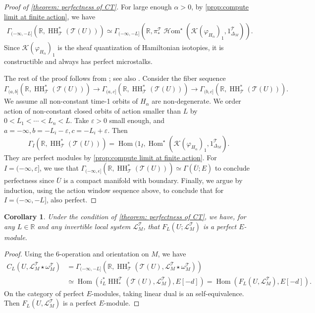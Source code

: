 \documentclass[11pt]{amsart}
\numberwithin{equation}{section}
\theoremstyle{plain}
\newtheorem{Coro}[coro]{Corollary}
\theoremstyle{definition}
\theoremstyle{remark}
\newcommand{\bR} { {\mathbb{R}}}
\newcommand{\cK} { {\mathcal{K}}}
\newcommand{\sT} { {\mathscr{T}}}
\newcommand\HH{\operatorname{HH}}
\newcommand\Hom{\operatorname{Hom}}
\newcommand\sHom{\operatorname{\mathscr{H}om}}
\begin{document}
\begin{proof}[Proof of \autoref{theorem: perfectness of CT}]
For large enough $\alpha > 0$, by \autoref{prop:compute limit at finite action}, we have
\begin{align*}
\Gamma_{(-\infty,-L]}(\bR, \HH_\sT^*(\sT(U))) 
\simeq \Gamma_{(-\infty, -L]}(\bR, \pi_*^\sT\sHom^\star(\cK(\varphi_{H_\alpha})_1, 1_{\Delta_M}^\sT)).
\end{align*}
Since $\cK(\varphi_{H_\alpha})_1$ is the sheaf quantization of Hamiltonian isotopies, it is constructible and always has perfect microstalks. 

The rest of the proof follows from \cite[Proposition B.12]{guillermouviterbo_gammasupport}; see also \cite[Proposition 7.13]{Hochschild-Kuo-Shende-Zhang}. Consider the fiber sequence
\[\Gamma_{(a,b]}(\bR, \HH_\sT^*(\sT(U))) \to \Gamma_{(a,c]}(\bR, \HH_\sT^*(\sT(U))) \to \Gamma_{(b,c]}(\bR, \HH_\sT^*(\sT(U))). \]
We assume all non-constant time-1 orbits of $H_\alpha$ are non-degenerate. We order action of non-constant closed orbits of action smaller than $L$ by $0<L_1<\cdots<L_n<L$.
Take $\varepsilon >0$ small enough, and $a=-\infty, b=-L_{i}-\varepsilon, c=-L_{i}+\varepsilon$. 
Then 
\[\Gamma_{I}(\bR, \HH_\sT^*(\sT(U)))=\Hom(1_{I}, \Hom^\star(\cK(\varphi_{H_\alpha})_1, 1_{\Delta_M}^\sT).\]
They are perfect modules by \autoref{prop:compute limit at finite action}. For $I=(-\infty,\varepsilon]$, we use \cite[Theorem 7.20]{Hochschild-Kuo-Shende-Zhang} that $\Gamma_{(-\infty,\epsilon]}(\bR, \HH_\sT^*(\sT(U))) \simeq \Gamma(\overline{U}; E)$ to conclude perfectness since $\overline{U}$ is a compact manifold with boundary. 
Finally, we argue by induction, using the action window sequence above, to conclude that for $I=(-\infty,-L]$, also perfect.
\end{proof}

\begin{Coro}Under the condition of \autoref{theorem: perfectness of CT}, we have, for any $L\in \bR$ and any invertible local system $\mathscr{L}_M^\sT$, that $F_L(U; \mathscr{L}_M^\sT)$
is a perfect $E$-module.
\end{Coro}
\begin{proof}Using the 6-operation and orientation on $M$, we have
\begin{align*}
C_L(U, \mathscr{L}_M^\sT \star \omega_M^\sT)&= \Gamma_{(-\infty,-L]}(\bR,\HH_\sT^*(\sT(U), \mathscr{L}_M^\sT \star \omega_M^\sT))\\
&\simeq \Hom(i^*_L\HH^\sT_*(\sT(U), \mathscr{L}_M^\sT), E[-d]) = \Hom(F_L(U, \mathscr{L}_M^\sT), E[-d]).
\end{align*}
On the category of perfect $E$-modules, taking linear dual is an self-equivalence. Then $F_L(U, \mathscr{L}_M^\sT)$ is a perfect $E$-module.
\end{proof}
\end{document}
